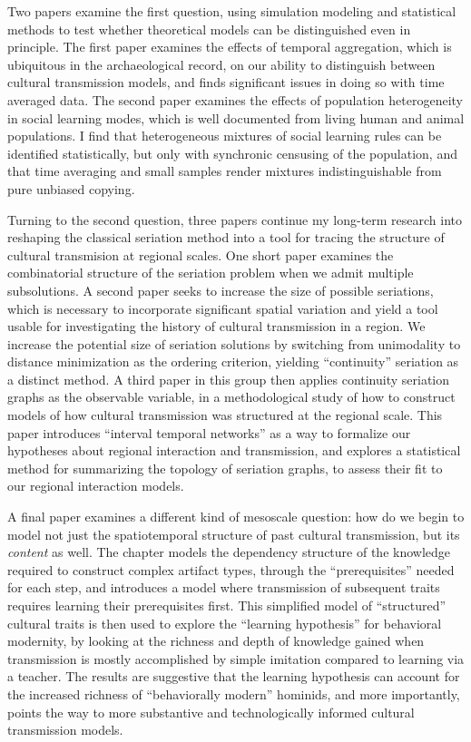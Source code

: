\begin{titlingpage}
Two papers examine the first question, using simulation modeling and statistical methods to test whether theoretical models can be distinguished even in principle.  The first paper examines the effects of temporal aggregation, which is ubiquitous in the archaeological record, on our ability to distinguish between cultural transmission models, and finds significant issues in doing so with time averaged data.  The second paper examines the effects of population heterogeneity in social learning modes, which is well documented from living human and animal populations.  I find that heterogeneous mixtures of social learning rules can be identified statistically, but only with synchronic censusing of the population, and that time averaging and small samples render mixtures indistinguishable from pure unbiased copying.  

Turning to the second question, three papers continue my long-term research into reshaping the classical seriation method into a tool for tracing the structure of cultural transmision at regional scales.  One short paper examines the combinatorial structure of the seriation problem when we admit multiple subsolutions.  A second paper seeks to increase the size of possible seriations, which is necessary to incorporate significant spatial variation and yield a tool usable for investigating the history of cultural transmission in a region.  We increase the potential size of seriation solutions by switching from unimodality to distance minimization as the ordering criterion, yielding ``continuity'' seriation as a distinct method.  A third paper in this group then applies continuity seriation graphs as the observable variable, in a methodological study of how to construct models of how cultural transmission was structured at the regional scale.  This paper introduces ``interval temporal networks'' as a way to formalize our hypotheses about regional interaction and transmission, and explores a statistical method for summarizing the topology of seriation graphs, to assess their fit to our regional interaction models.

A final paper examines a different kind of mesoscale question:  how do we begin to model not just the spatiotemporal structure of past cultural transmission, but its \emph{content} as well.  The chapter models the dependency structure of the knowledge required to construct complex artifact types, through the ``prerequisites'' needed for each step, and introduces a model where transmission of subsequent traits requires learning their prerequisites first.  This simplified model of ``structured'' cultural traits is then used to explore the ``learning hypothesis'' for behavioral modernity, by looking at the richness and depth of knowledge gained when transmission is mostly accomplished by simple imitation compared to learning via a teacher.  The results are suggestive that the learning hypothesis can account for the increased richness of ``behaviorally modern'' hominids, and more importantly, points the way to more substantive and technologically informed cultural transmission models.  


\end{titlingpage}